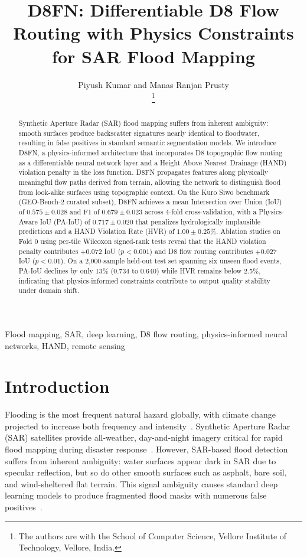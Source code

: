 \documentclass[journal]{IEEEtran}
\title{D8FN: Differentiable D8 Flow Routing with Physics Constraints for SAR Flood Mapping}
\author{Piyush Kumar and Manas Ranjan Prusty\\
\thanks{The authors are with the School of Computer Science, Vellore Institute of Technology, Vellore, India.}}
\begin{document}
\maketitle

\begin{abstract}
Synthetic Aperture Radar (SAR) flood mapping suffers from inherent ambiguity: smooth surfaces produce backscatter signatures nearly identical to floodwater, resulting in false positives in standard semantic segmentation models. We introduce D8FN, a physics-informed architecture that incorporates D8 topographic flow routing as a differentiable neural network layer and a Height Above Nearest Drainage (HAND) violation penalty in the loss function. D8FN propagates features along physically meaningful flow paths derived from terrain, allowing the network to distinguish flood from look-alike surfaces using topographic context. On the Kuro Siwo benchmark (GEO-Bench-2 curated subset), D8FN achieves a mean Intersection over Union (IoU) of $0.575 \pm 0.028$ and F1 of $0.679 \pm 0.023$ across 4-fold cross-validation, with a Physics-Aware IoU (PA-IoU) of $0.717 \pm 0.020$ that penalizes hydrologically implausible predictions and a HAND Violation Rate (HVR) of $1.00 \pm 0.25\%$. Ablation studies on Fold 0 using per-tile Wilcoxon signed-rank tests reveal that the HAND violation penalty contributes $+0.072$ IoU ($p < 0.001$) and D8 flow routing contributes $+0.027$ IoU ($p < 0.01$). On a 2,000-sample held-out test set spanning six unseen flood events, PA-IoU declines by only 13\% (0.734 to 0.640) while HVR remains below 2.5\%, indicating that physics-informed constraints contribute to output quality stability under domain shift.
\end{abstract}

\begin{IEEEkeywords}
Flood mapping, SAR, deep learning, D8 flow routing, physics-informed neural networks, HAND, remote sensing
\end{IEEEkeywords}

\section{Introduction}

Flooding is the most frequent natural hazard globally, with climate change projected to increase both frequency and intensity~\cite{ipcc}. Synthetic Aperture Radar (SAR) satellites provide all-weather, day-and-night imagery critical for rapid flood mapping during disaster response~\cite{sar_flood_survey}. However, SAR-based flood detection suffers from inherent ambiguity: water surfaces appear dark in SAR due to specular reflection, but so do other smooth surfaces such as asphalt, bare soil, and wind-sheltered flat terrain. This signal ambiguity causes standard deep learning models to produce fragmented flood masks with numerous false positives~\cite{sen1floods11,kuro_siwo}.
\end{document}
